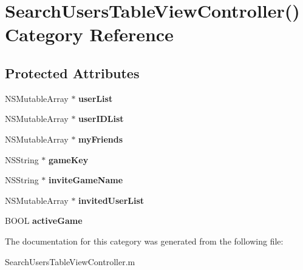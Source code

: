 \hypertarget{category_search_users_table_view_controller_07_08}{\section{Search\+Users\+Table\+View\+Controller() Category Reference}
\label{category_search_users_table_view_controller_07_08}
}
\subsection*{Protected Attributes}
\begin{DoxyCompactItemize}
\item 
\hypertarget{category_search_users_table_view_controller_07_08_a0921ba931e2f1a930a863431ef49d7e1}{N\+S\+Mutable\+Array $\ast$ {\bfseries user\+List}}\label{category_search_users_table_view_controller_07_08_a0921ba931e2f1a930a863431ef49d7e1}

\item 
\hypertarget{category_search_users_table_view_controller_07_08_a050d2c2d0ac47c8c48b449bb8410367c}{N\+S\+Mutable\+Array $\ast$ {\bfseries user\+I\+D\+List}}\label{category_search_users_table_view_controller_07_08_a050d2c2d0ac47c8c48b449bb8410367c}

\item 
\hypertarget{category_search_users_table_view_controller_07_08_a8fda2a3f0e82802904562be07f2aab69}{N\+S\+Mutable\+Array $\ast$ {\bfseries my\+Friends}}\label{category_search_users_table_view_controller_07_08_a8fda2a3f0e82802904562be07f2aab69}

\item 
\hypertarget{category_search_users_table_view_controller_07_08_a20605a0d4c86f63a526d8d09628dd80b}{N\+S\+String $\ast$ {\bfseries game\+Key}}\label{category_search_users_table_view_controller_07_08_a20605a0d4c86f63a526d8d09628dd80b}

\item 
\hypertarget{category_search_users_table_view_controller_07_08_a00e233cfeb255a322204d5d614a90f59}{N\+S\+String $\ast$ {\bfseries invite\+Game\+Name}}\label{category_search_users_table_view_controller_07_08_a00e233cfeb255a322204d5d614a90f59}

\item 
\hypertarget{category_search_users_table_view_controller_07_08_ab6e7b759aaaa3e9debb5ae0e8a0d7a16}{N\+S\+Mutable\+Array $\ast$ {\bfseries invited\+User\+List}}\label{category_search_users_table_view_controller_07_08_ab6e7b759aaaa3e9debb5ae0e8a0d7a16}

\item 
\hypertarget{category_search_users_table_view_controller_07_08_ae4e00449f54965443aa8db83cfdc640e}{B\+O\+O\+L {\bfseries active\+Game}}\label{category_search_users_table_view_controller_07_08_ae4e00449f54965443aa8db83cfdc640e}

\end{DoxyCompactItemize}


The documentation for this category was generated from the following file\+:\begin{DoxyCompactItemize}
\item 
Search\+Users\+Table\+View\+Controller.\+m\end{DoxyCompactItemize}
